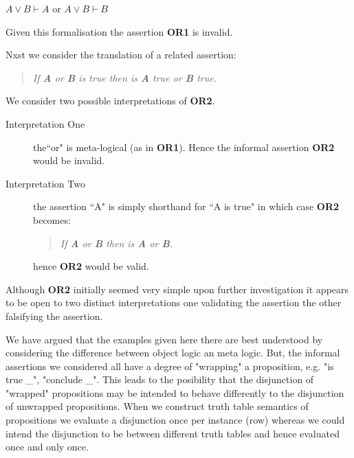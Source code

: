
\hspace{\fill} $A\vee B \vdash A$  \quad or \quad $A\vee B \vdash B $ \hspace{\fill}

\noindent Given this formalisation the assertion  {\bf OR1} is invalid.

Nxst we consider the translation of a related assertion:
 \begin{quote}
 \emph{If {\bf A} or {\bf B} is true then is  {\bf A}  true or {\bf B}  true.\hspace{\fill}{\bf OR2}}
 \end{quote}
 
We consider two possible interpretations of {\bf OR2}. 
\begin{description}
\item [Interpretation One ] the``or" is meta-logical (as in {\bf OR1}). Hence the informal assertion {\bf OR2} would be invalid.
\item [Interpretation Two] the assertion ``A" is simply shorthand for  ``A is true" in which case {\bf OR2} becomes:
\begin{quote}
 \emph{If {\bf A} or {\bf B}  then is {\bf A}  or  {\bf B}.\hspace{\fill}{\bf OR3}}
 \end{quote}
hence {\bf OR2} would be valid.  
\end{description}
Although {\bf OR2} initially seemed very simple upon further investigation it appears to be open to two distinct interpretations one validating the assertion the other falsifying the assertion.


We have argued that the examples given here there are best understood by  considering the difference between object logic an meta logic.  But, the informal assertions we considered all have a degree of "wrapping" a proposition, e.g. "is true \_", "conclude \_". This leads to the posibility that the disjunction of "wrapped" propositions may be intended to behave differently to the disjunction of unwrapped propositions.  When we construct truth table semantics of propositions we evaluate a disjunction once per instance (row) whereas we could intend the disjunction to be between different truth tables and hence evaluated once and only once.


